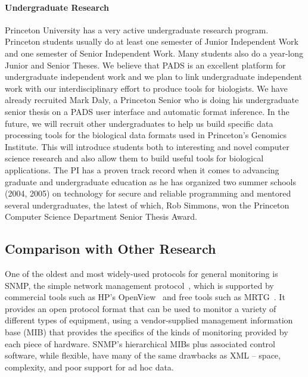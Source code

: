 \documentclass[10pt]{article}
\begin{document}

\paragraph*{Undergraduate Research}
Princeton University has a very active undergraduate research program.
Princeton students usually do at least one semester of
Junior Independent Work and one semester of Senior Independent Work. 
Many students also do a year-long
Junior and Senior Theses.  We believe that PADS is an excellent
platform for undergraduate independent work and we plan to link
undergraduate independent work with our interdisciplinary effort to
produce tools for biologists.  We have already recruited Mark Daly,
a Princeton Senior who is doing his undergraduate senior thesis
on a PADS user interface and automatic format inference.
In the future, we will recruit other undergraduates to help us build
specific data processing tools for the biological data formats
used in Princeton's Genomics Institute.
This will introduce students both to interesting and novel
computer science research and also allow them to build useful
tools for biological applications. The PI has a proven track record
when it comes to advancing graduate and undergraduate education
as he has organized two summer schools (2004, 2005) on technology for
secure and reliable programming and mentored several undergraduates,
the latest of which, Rob Simmons, won the Princeton Computer Science Department
Senior Thesis Award.

\subsection{Comparison with Other Research}
\label{ssec:related}

One of the oldest and most widely-used protocols for general monitoring
is SNMP, the simple network management protocol~\cite{snmprfc1157},
which is supported by commercial tools such as HP's
OpenView~\cite{openview} and free tools such as MRTG~\cite{mrtg}. It
provides an open protocol format that can be used to monitor a variety
of different types of equipment, using a vendor-supplied management
information base (MIB) that provides the specifics of the kinds of
monitoring provided by each piece of hardware. SNMP's hierarchical
MIBs plus associated control software, while flexible, have many of
the same drawbacks as XML -- space, complexity, and poor support for
ad hoc data.
\end{document}
